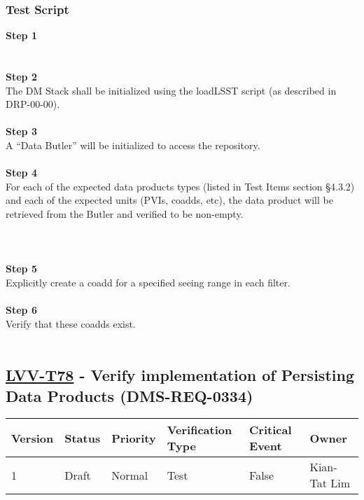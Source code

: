 \hypertarget{test-script-167}{%
\subsubsection{Test Script}\label{test-script-167}}

\textbf{Step 1}\\
~\\
~\\
\textbf{Step 2}\\
The DM Stack shall be initialized using the loadLSST script (as
described in DRP-00-00).\\
~\\
\textbf{Step 3}\\
A ``Data Butler'' will be initialized to access the repository.\\
~\\
\textbf{Step 4}\\
For each of the expected data products types (listed in Test Items
section §4.3.2) and each of the expected units (PVIs, coadds, etc), the
data product will be retrieved from the Butler and verified to be
non-empty.\\
~\\
~\\
~\\
\textbf{Step 5}\\
Explicitly create a coadd for a specified seeing range in each filter.\\
~\\
\textbf{Step 6}\\
Verify that these coadds exist.\\
~\\

\hypertarget{lvv-t78---verify-implementation-of-persisting-data-products-dms-req-0334}{%
\subsection{\texorpdfstring{\href{https://jira.lsstcorp.org/secure/Tests.jspa\#/testCase/LVV-T78}{LVV-T78}
- Verify implementation of Persisting Data Products
(DMS-REQ-0334)}{LVV-T78 - Verify implementation of Persisting Data Products (DMS-REQ-0334)}}\label{lvv-t78---verify-implementation-of-persisting-data-products-dms-req-0334}}

\begin{longtable}[]{@{}llllll@{}}
\toprule
Version & Status & Priority & Verification Type & Critical Event &
Owner\tabularnewline
\midrule
\endhead
1 & Draft & Normal & Test & False & Kian-Tat Lim\tabularnewline
\bottomrule
\end{longtable}

